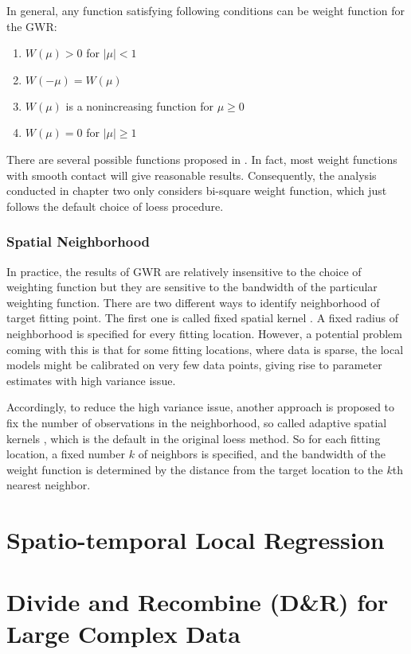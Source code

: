 In general, any function satisfying following conditions can be weight function
for the GWR:
\begin{enumerate}
\item $W(\mu) > 0$ for $|\mu| < 1$
\item $W(-\mu) = W(\mu)$
\item $W(\mu)$ is a nonincreasing function for $\mu \ge 0$
\item $W(\mu) = 0$ for $|\mu| \ge 1$
\end{enumerate}
There are several possible functions proposed in \cite{fotheringhamgeographically}.
In fact, most weight functions with smooth contact will give reasonable results.
Consequently, the analysis conducted in chapter two only considers bi-square
weight function, which just follows the default choice of loess procedure.

\subsubsection{Spatial Neighborhood}

In practice, the results of GWR are relatively insensitive to the choice of 
weighting function but they are sensitive to the bandwidth of the particular 
weighting function.
There are two different ways to identify neighborhood of 
target fitting point. The first one is called fixed spatial kernel 
\cite{fotheringhamgeographically}. A fixed radius of neighborhood is specified
for every fitting location. 
However, a potential problem coming with this is that for some fitting locations,
where data is sparse, the local models might be calibrated on very few data points, 
giving rise to parameter estimates with high variance issue. 

Accordingly, to reduce the high variance issue, another approach is proposed to 
fix the number of observations in the neighborhood, so called adaptive spatial
kernels \cite{fotheringhamgeographically}, which is the default in the original 
loess method. So for each fitting location, a fixed number $k$ of neighbors is 
specified, and the bandwidth of the weight function is determined by the distance
from the target location to the $k$th nearest neighbor. 

\section{Spatio-temporal Local Regression}

\section{Divide and Recombine (D\&R) for Large Complex Data}

